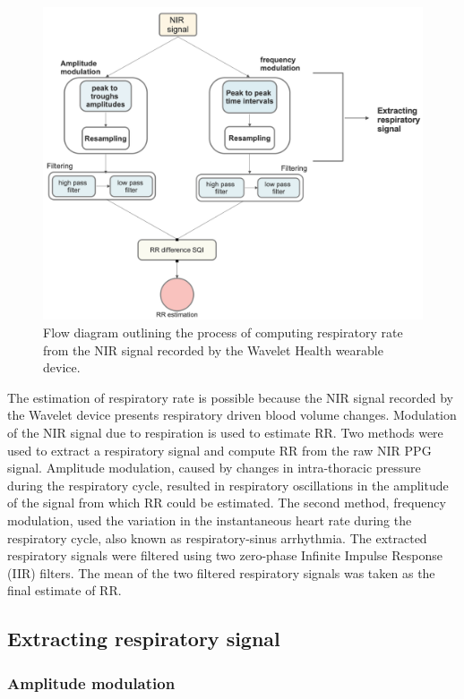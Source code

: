 \begin{figure}[!ht]
    \centering
\includegraphics[width=0.67\linewidth,keepaspectratio=true]{./figures/RRflowchart.png}
    \caption{Flow diagram outlining the process  of computing respiratory rate from the NIR signal recorded by the Wavelet Health wearable device.}
    \label{fig:ppg_rr_est_overview} 
\end{figure}

The estimation of respiratory rate is possible because the NIR signal recorded by the Wavelet device presents respiratory driven blood volume changes. Modulation of the NIR signal due to respiration is used to estimate RR. Two methods were used to extract a respiratory signal and compute RR from the raw NIR PPG signal. Amplitude modulation, caused by changes in intra-thoracic pressure during the respiratory cycle, resulted in respiratory oscillations in the amplitude of the signal from which RR could be estimated. The second method, frequency modulation, used the variation in the instantaneous heart rate during the respiratory cycle, also known as respiratory-sinus arrhythmia. The extracted respiratory signals were filtered using two zero-phase Infinite Impulse Response (IIR) filters. The mean of the two filtered respiratory signals was taken as the final estimate of RR.

\subsection{Extracting respiratory signal}

\subsubsection{Amplitude modulation}

